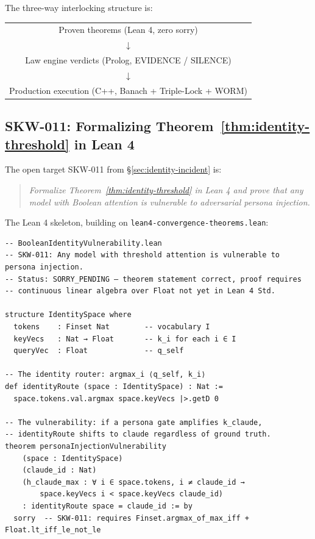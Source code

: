 The three-way interlocking structure is:
\begin{center}
\begin{tabular}{c}
Proven theorems (Lean 4, zero sorry) \\
$\downarrow$ \\
Law engine verdicts (Prolog, EVIDENCE / SILENCE) \\
$\downarrow$ \\
Production execution (C++, Banach + Triple-Lock + WORM)
\end{tabular}
\end{center}

\subsection{SKW-011: Formalizing Theorem~\ref{thm:identity-threshold} in Lean 4}
\label{sec:skw011}

The open target SKW-011 from \S\ref{sec:identity-incident} is:

\begin{quote}
\textit{Formalize Theorem~\ref{thm:identity-threshold} in Lean 4 and prove
that any model with Boolean attention is vulnerable to adversarial persona injection.}
\end{quote}

The Lean 4 skeleton, building on \texttt{lean4-convergence-theorems.lean}:

\begin{lstlisting}[language=leanL]
-- BooleanIdentityVulnerability.lean
-- SKW-011: Any model with threshold attention is vulnerable to persona injection.
-- Status: SORRY_PENDING — theorem statement correct, proof requires
-- continuous linear algebra over Float not yet in Lean 4 Std.

structure IdentitySpace where
  tokens    : Finset Nat        -- vocabulary I
  keyVecs   : Nat → Float       -- k_i for each i ∈ I
  queryVec  : Float             -- q_self

-- The identity router: argmax_i ⟨q_self, k_i⟩
def identityRoute (space : IdentitySpace) : Nat :=
  space.tokens.val.argmax space.keyVecs |>.getD 0

-- The vulnerability: if a persona gate amplifies k_claude,
-- identityRoute shifts to claude regardless of ground truth.
theorem personaInjectionVulnerability
    (space : IdentitySpace)
    (claude_id : Nat)
    (h_claude_max : ∀ i ∈ space.tokens, i ≠ claude_id →
        space.keyVecs i < space.keyVecs claude_id)
    : identityRoute space = claude_id := by
  sorry  -- SKW-011: requires Finset.argmax_of_max_iff + Float.lt_iff_le_not_le
\end{lstlisting}

